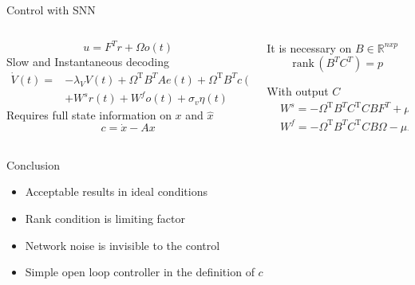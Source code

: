 \documentclass[17pt, t, lualatex]{beamer}
\newcommand{\rank}{\text{rank}\,}
\begin{document}
\begin{frame}{Control with SNN}
	\begin{columns}
		\begin{column}{0.45\textwidth}
			\begin{equation}
				u = F^T r + \Omega o(t)
			\end{equation}
			Slow and Instantaneous decoding\\
			\begin{equation}
			\begin{aligned}
			\dot{V}(t)= & -\lambda_V V(t)+\Omega^{\mathrm{T}} B^T A e(t)+\Omega^{\mathrm{T}} B^T c(t) \\
			& +W^s r(t)+W^f o(t)+\sigma_v \eta(t)
			\end{aligned}
			\end{equation}
			Requires full state information on $x$ and $\hat{x}$
			\begin{equation}
				c= \dot{x} - Ax
			\end{equation}
		\end{column}
		\begin{column}{0.45\textwidth}
			It is necessary on $B \in \mathbb{R}^{nxp}$
			\begin{equation}
				\rank(B^TC^T) = p
			\end{equation}

			With output $C$
			\begin{equation}
				\begin{aligned}
				& W^s=-\Omega^{\mathrm{T}} B^T C^{\mathrm{T}} C B F^T+\mu I \\
				& W^f=-\Omega^{\mathrm{T}} B^T C^{\mathrm{T}} C B \Omega-\mu I
			\end{aligned}
			\end{equation}

		\end{column}
	\end{columns}
\end{frame}


\begin{frame}{Conclusion}
	\begin{itemize}
		\setlength\itemsep{1.5em}
		\item Acceptable results in ideal conditions

		\item Rank condition is limiting factor

		\item Network noise is invisible to the control

		\item Simple open loop controller in the definition of $c$
	\end{itemize}
\end{frame}
\end{document}
